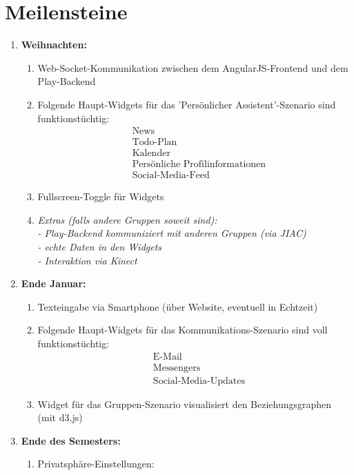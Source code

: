 \documentclass[10pt,a4paper]{article}
\begin{document}
\section{Meilensteine}
\begin{enumerate}
\item \textbf{Weihnachten:}\\
\begin{enumerate}
\item Web-Socket-Kommunikation zwischen dem AngularJS-Frontend und dem Play-Backend
\item Folgende Haupt-Widgets für das 'Persönlicher Assistent'-Szenario sind funktionstüchtig:
\begin{align*}
&\text{News} \\
&\text{Todo-Plan} \\
&\text{Kalender} \\
&\text{Persönliche Profilinformationen} \\
&\text{Social-Media-Feed}
\end{align*}
\item Fullscreen-Toggle für Widgets
\item \textit{Extras (falls andere Gruppen soweit sind):\\
	- Play-Backend kommuniziert mit anderen Gruppen (via JIAC)\\
	- echte Daten in den Widgets\\
	- Interaktion via Kinect}
\end{enumerate}
\item \textbf{Ende Januar:}\\
\begin{enumerate}
\item Texteingabe via Smartphone (über Website, eventuell in Echtzeit)
\item Folgende Haupt-Widgets für das Kommunikations-Szenario sind voll funktionstüchtig:
\begin{align*}
&\text{E-Mail} \\
&\text{Messengers} \\
&\text{Social-Media-Updates}
\end{align*}
\item Widget für das Gruppen-Szenario visualisiert den Beziehungsgraphen (mit d3.js)
\end{enumerate}
\item \textbf{Ende des Semesters:}\\
\begin{enumerate}
\item Privatsphäre-Einstellungen:

\end{enumerate}
\end{enumerate}
\end{document}
